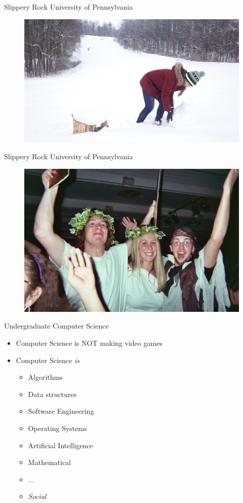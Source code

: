 \documentclass{beamer}
\begin{document}
\begin{frame}{Slippery Rock University of Pennsylvania}
\begin{figure}
	\includegraphics[width=\linewidth]{img/sru3.jpg}
\end{figure}
\end{frame}

\begin{frame}{Slippery Rock University of Pennsylvania}
\begin{figure}
	\includegraphics[width=\linewidth]{img/sru5.jpg}
\end{figure}
\end{frame}

\begin{frame}{Undergraduate Computer Science}
\begin{itemize}
	\item Computer Science is NOT making video games
	\item Computer Science \emph{is}
	\begin{itemize}
		\item Algorithms
		\item Data structures
		\item Software Engineering
		\item Operating Systems
		\item Artificial Intelligence
		\item Mathematical
		\item ...
		\item \emph{Social}
	\end{itemize}
\end{itemize}
\end{frame}
\end{document}
